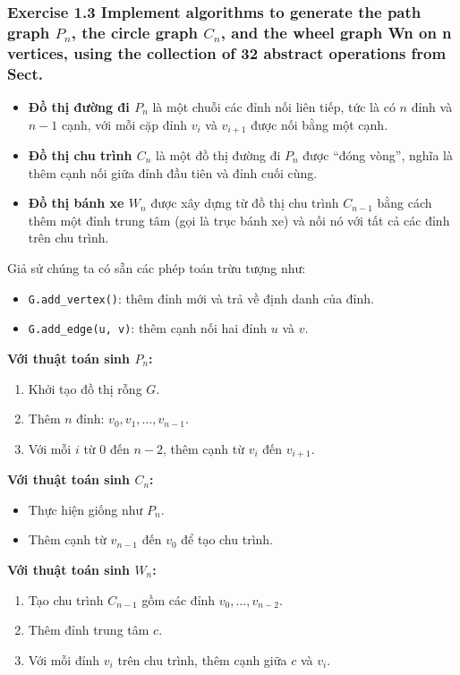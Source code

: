 \documentclass{article}
\begin{document}
	\subsubsection*{ Exercise 1.3 Implement algorithms to generate the path graph $P_n$, the circle graph $C_n$, and the wheel graph Wn on n vertices, using the collection of 32 abstract operations from Sect.}
	
	\begin{itemize}
		\item \textbf{Đồ thị đường đi $P_n$} là một chuỗi các đỉnh nối liên tiếp, tức là có $n$ đỉnh và $n - 1$ cạnh, với mỗi cặp đỉnh $v_i$ và $v_{i+1}$ được nối bằng một cạnh.
		
		\item \textbf{Đồ thị chu trình $C_n$} là một đồ thị đường đi $P_n$ được “đóng vòng”, nghĩa là thêm cạnh nối giữa đỉnh đầu tiên và đỉnh cuối cùng.
		
		\item \textbf{Đồ thị bánh xe $W_n$} được xây dựng từ đồ thị chu trình $C_{n-1}$ bằng cách thêm một đỉnh trung tâm (gọi là trục bánh xe) và nối nó với tất cả các đỉnh trên chu trình.
	\end{itemize}
	
	Giả sử chúng ta có sẵn các phép toán trừu tượng như:
	\begin{itemize}
		\item \texttt{G.add\_vertex()}: thêm đỉnh mới và trả về định danh của đỉnh.
		\item \texttt{G.add\_edge(u, v)}: thêm cạnh nối hai đỉnh $u$ và $v$.
	\end{itemize}
	
	\textbf{Với thuật toán sinh $P_n$:}
	\begin{enumerate}
		\item Khởi tạo đồ thị rỗng $G$.
		\item Thêm $n$ đỉnh: $v_0, v_1, \ldots, v_{n-1}$.
		\item Với mỗi $i$ từ $0$ đến $n-2$, thêm cạnh từ $v_i$ đến $v_{i+1}$.
	\end{enumerate}
	
	\textbf{Với thuật toán sinh $C_n$:}
	\begin{itemize}
		\item Thực hiện giống như $P_n$.
		\item Thêm cạnh từ $v_{n-1}$ đến $v_0$ để tạo chu trình.
	\end{itemize}
	
	\textbf{Với thuật toán sinh $W_n$:}
	\begin{enumerate}
		\item Tạo chu trình $C_{n-1}$ gồm các đỉnh $v_0, \ldots, v_{n-2}$.
		\item Thêm đỉnh trung tâm $c$.
		\item Với mỗi đỉnh $v_i$ trên chu trình, thêm cạnh giữa $c$ và $v_i$.
	\end{enumerate}
	
\end{document}
